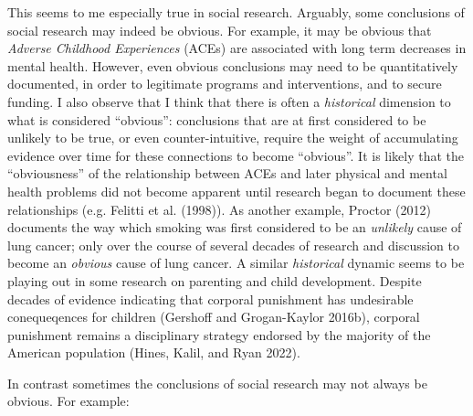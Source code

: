 \documentclass[
  letterpaper,
  DIV=11,
  numbers=noendperiod]{scrreprt}
\begin{document}
This seems to me especially true in social research. Arguably, some
conclusions of social research may indeed be obvious. For example, it
may be obvious that \emph{Adverse Childhood Experiences} (ACEs) are
associated with long term decreases in mental health. However, even
obvious conclusions may need to be quantitatively documented, in order
to legitimate programs and interventions, and to secure funding. I also
observe that I think that there is often a \emph{historical} dimension
to what is considered ``obvious'': conclusions that are at first
considered to be unlikely to be true, or even counter-intuitive, require
the weight of accumulating evidence over time for these connections to
become ``obvious''. It is likely that the ``obviousness'' of the
relationship between ACEs and later physical and mental health problems
did not become apparent until research began to document these
relationships (e.g. Felitti et al. (1998)). As another example, Proctor
(2012) documents the way which smoking was first considered to be an
\emph{unlikely} cause of lung cancer; only over the course of several
decades of research and discussion to become an \emph{obvious} cause of
lung cancer. A similar \emph{historical} dynamic seems to be playing out
in some research on parenting and child development. Despite decades of
evidence indicating that corporal punishment has undesirable
conequeqences for children (Gershoff and Grogan-Kaylor 2016b), corporal
punishment remains a disciplinary strategy endorsed by the majority of
the American population (Hines, Kalil, and Ryan 2022).

In contrast sometimes the conclusions of social research may not always
be obvious. For example:
\end{document}
